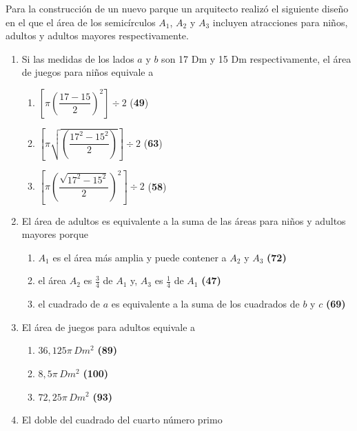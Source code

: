\documentclass[letterpaper,11pt,twoside]{article}
\begin{document}
\begin{multicols}{2}
Para la construcción de un nuevo parque un arquitecto realizó el siguiente diseño en el que el área de los semicírculos $A_{1}$, $A_{2}$ y $A_{3}$ incluyen atracciones para niños, adultos y adultos mayores respectivamente.
\begin{enumerate}
\item \label{q01} Si las medidas de los lados $a$ y $b$ son 17 Dm y 15 Dm respectivamente, el área de juegos para niños equivale a
\begin{enumerate}
\item $\left[\pi \left(\dfrac{17-15}{2}\right)^{2}\right]\div 2$ \qquad (\textbf{49})
\item $\left[\pi \sqrt{\left(\dfrac{17^{2}-15^{2}}{2}\right)}\right]\div 2$ \qquad (\textbf{63})
\item $\left[\pi \left(\dfrac{\sqrt{17^{2}-15^{2}}}{2}\right)^{2}\right]\div 2$ \qquad (\textbf{58})
\end{enumerate}
\item \label{q02} El área de adultos es equivalente a la suma de las áreas para niños y adultos mayores porque
\begin{enumerate}
\item $A_{1}$ es el área más amplia y puede contener a $A_{2}$ y $A_{3}$ \quad \textbf{(72)}
\item el área $A_{2}$ es $\frac{3}{4}$ de $A_{1}$ y, $A_{3}$ es $\frac{1}{4}$ de $A_{1}$ \quad \textbf{(47)}
\item el cuadrado de $a$ es equivalente a la suma de los cuadrados de $b$ y $c$ \quad \textbf{(69)}
\end{enumerate}
\item El área de juegos para adultos equivale a
\begin{enumerate}
\item $36,125\pi\, Dm^{2}$ \quad \textbf{(89)}
\item $8,5\pi \, Dm^{2}$ \quad \textbf{(100)}
\item $72,25\pi \, Dm^{2}$ \quad \textbf{(93)}
\end{enumerate}
\item El doble del cuadrado del cuarto número primo

\end{enumerate}
\end{multicols}
\end{document}

